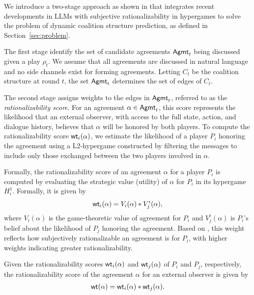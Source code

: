 We introduce a two-stage approach as shown in  that integrates recent developments in LLMs with subjective rationalizability in hypergames to solve the problem of dynamic coalition structure prediction, as defined in Section~\ref{sec:problem}.

The first stage identify the set of candidate agreements $\mathsf{Agmt}_t$ being discussed given a play $\rho_t$. 
We assume that all agreements are discussed in natural language and no side channels exist for forming agreements. 
Letting $C_t$ be the coalition structure at round $t$, the set $\mathsf{Agmt}_t$ determines the set of edges of $C_t$.


The second stage assigns weights to the edges in $\mathsf{Agmt}_t$, referred to as the \emph{rationalizability score}. 
For an agreement $\alpha \in \mathsf{Agmt}_t$, this score represents the likelihood that an external observer, with access to the full state, action, and dialogue history, believes that $\alpha$ will be honored by both players. 
To compute the rationalizability score $\mathsf{wt}_i(\alpha)$, we estimate the likelihood of a player $P_i$ honoring the agreement using a L2-hypergame constructed by filtering the messages to include only those exchanged between the two players involved in $\alpha$.


Formally, the rationalizability score of an agreement $\alpha$ for a player $P_i$ is computed by evaluating the strategic value (utility) of $\alpha$ for $P_i$ in its hypergame $H_i^1$. Formally, it is given by
\begin{align*}
	\mathsf{wt}_i(\alpha) = V_i(\alpha) * V_{j}^i(\alpha),
\end{align*}
where $V_i(\alpha)$ is the game-theoretic value of agreement for $P_i$ and $V_{j}^i(\alpha)$ is $P_i$'s belief about the likelihood of $P_j$ honoring the agreement.
Based on , this weight reflects how subjectively rationalizable an agreement is for $P_i$, with higher weights indicating greater rationalizability.


Given the rationalizability scores $\mathsf{wt}_i(\alpha)$ and $\mathsf{wt}_j(\alpha)$ of $P_i$ and $P_j$, respectively, the rationalizability score of the agreement $\alpha$ for an external observer is given by 
\begin{align*}
	\mathsf{wt}(\alpha) = \mathsf{wt}_i(\alpha) * \mathsf{wt}_j(\alpha).
\end{align*}

